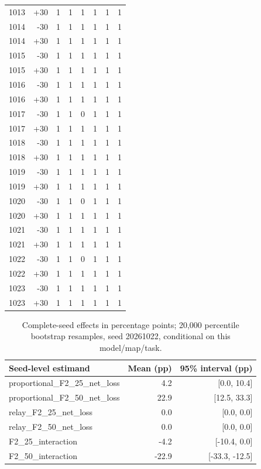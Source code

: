 \documentclass[10pt,letterpaper]{article}
\begin{document}
{\begin{longtable}{lrrrrrrr}
1013 & +30 & 1 & 1 & 1 & 1 & 1 & 1\\
1014 & -30 & 1 & 1 & 1 & 1 & 1 & 1\\
1014 & +30 & 1 & 1 & 1 & 1 & 1 & 1\\
1015 & -30 & 1 & 1 & 1 & 1 & 1 & 1\\
1015 & +30 & 1 & 1 & 1 & 1 & 1 & 1\\
1016 & -30 & 1 & 1 & 1 & 1 & 1 & 1\\
1016 & +30 & 1 & 1 & 1 & 1 & 1 & 1\\
1017 & -30 & 1 & 1 & 0 & 1 & 1 & 1\\
1017 & +30 & 1 & 1 & 1 & 1 & 1 & 1\\
1018 & -30 & 1 & 1 & 1 & 1 & 1 & 1\\
1018 & +30 & 1 & 1 & 1 & 1 & 1 & 1\\
1019 & -30 & 1 & 1 & 1 & 1 & 1 & 1\\
1019 & +30 & 1 & 1 & 1 & 1 & 1 & 1\\
1020 & -30 & 1 & 1 & 0 & 1 & 1 & 1\\
1020 & +30 & 1 & 1 & 1 & 1 & 1 & 1\\
1021 & -30 & 1 & 1 & 1 & 1 & 1 & 1\\
1021 & +30 & 1 & 1 & 1 & 1 & 1 & 1\\
1022 & -30 & 1 & 1 & 0 & 1 & 1 & 1\\
1022 & +30 & 1 & 1 & 1 & 1 & 1 & 1\\
1023 & -30 & 1 & 1 & 1 & 1 & 1 & 1\\
1023 & +30 & 1 & 1 & 1 & 1 & 1 & 1\\
\bottomrule
\end{longtable}
}

\begin{table}[H]
\centering\small
\caption{Complete-seed effects in percentage points; 20,000 percentile bootstrap resamples, seed 20261022, conditional on this model/map/task.}
\begin{tabular}{lrr}
\toprule
Seed-level estimand & Mean (pp) & 95\% interval (pp)\\
\midrule
proportional\_F2\_25\_net\_loss & 4.2 & [0.0, 10.4]\\
proportional\_F2\_50\_net\_loss & 22.9 & [12.5, 33.3]\\
relay\_F2\_25\_net\_loss & 0.0 & [0.0, 0.0]\\
relay\_F2\_50\_net\_loss & 0.0 & [0.0, 0.0]\\
F2\_25\_interaction & -4.2 & [-10.4, 0.0]\\
F2\_50\_interaction & -22.9 & [-33.3, -12.5]\\
\bottomrule
\end{tabular}
\end{table}
\end{document}
